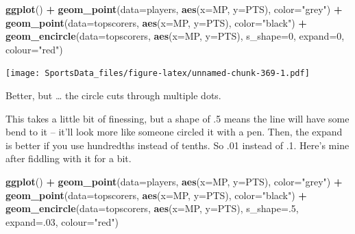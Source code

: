 \documentclass[
]{book}
\newenvironment{Shaded}{\begin{snugshade}}{\end{snugshade}}
\newcommand{\DataTypeTok}[1]{\textcolor[rgb]{0.13,0.29,0.53}{#1}}
\newcommand{\DecValTok}[1]{\textcolor[rgb]{0.00,0.00,0.81}{#1}}
\newcommand{\KeywordTok}[1]{\textcolor[rgb]{0.13,0.29,0.53}{\textbf{#1}}}
\newcommand{\NormalTok}[1]{#1}
\newcommand{\OperatorTok}[1]{\textcolor[rgb]{0.81,0.36,0.00}{\textbf{#1}}}
\newcommand{\StringTok}[1]{\textcolor[rgb]{0.31,0.60,0.02}{#1}}
\begin{document}
\begin{Shaded}
\begin{Highlighting}[]
\KeywordTok{ggplot}\NormalTok{() }\OperatorTok{+}\StringTok{ }
\StringTok{  }\KeywordTok{geom_point}\NormalTok{(}\DataTypeTok{data=}\NormalTok{players, }\KeywordTok{aes}\NormalTok{(}\DataTypeTok{x=}\NormalTok{MP, }\DataTypeTok{y=}\NormalTok{PTS), }\DataTypeTok{color=}\StringTok{"grey"}\NormalTok{) }\OperatorTok{+}\StringTok{ }
\StringTok{  }\KeywordTok{geom_point}\NormalTok{(}\DataTypeTok{data=}\NormalTok{topscorers, }\KeywordTok{aes}\NormalTok{(}\DataTypeTok{x=}\NormalTok{MP, }\DataTypeTok{y=}\NormalTok{PTS), }\DataTypeTok{color=}\StringTok{"black"}\NormalTok{) }\OperatorTok{+}\StringTok{ }
\StringTok{  }\KeywordTok{geom_encircle}\NormalTok{(}\DataTypeTok{data=}\NormalTok{topscorers, }\KeywordTok{aes}\NormalTok{(}\DataTypeTok{x=}\NormalTok{MP, }\DataTypeTok{y=}\NormalTok{PTS), }\DataTypeTok{s_shape=}\DecValTok{0}\NormalTok{, }\DataTypeTok{expand=}\DecValTok{0}\NormalTok{, }\DataTypeTok{colour=}\StringTok{"red"}\NormalTok{)}
\end{Highlighting}
\end{Shaded}

\texttt{[image: SportsData\_files/figure-latex/unnamed-chunk-369-1.pdf]}

Better, but \ldots{} the circle cuts through multiple dots.

This takes a little bit of finessing, but a shape of .5 means the line will have some bend to it -- it'll look more like someone circled it with a pen. Then, the expand is better if you use hundredths instead of tenths. So .01 instead of .1. Here's mine after fiddling with it for a bit.

\begin{Shaded}
\begin{Highlighting}[]
\KeywordTok{ggplot}\NormalTok{() }\OperatorTok{+}\StringTok{ }
\StringTok{  }\KeywordTok{geom_point}\NormalTok{(}\DataTypeTok{data=}\NormalTok{players, }\KeywordTok{aes}\NormalTok{(}\DataTypeTok{x=}\NormalTok{MP, }\DataTypeTok{y=}\NormalTok{PTS), }\DataTypeTok{color=}\StringTok{"grey"}\NormalTok{) }\OperatorTok{+}\StringTok{ }
\StringTok{  }\KeywordTok{geom_point}\NormalTok{(}\DataTypeTok{data=}\NormalTok{topscorers, }\KeywordTok{aes}\NormalTok{(}\DataTypeTok{x=}\NormalTok{MP, }\DataTypeTok{y=}\NormalTok{PTS), }\DataTypeTok{color=}\StringTok{"black"}\NormalTok{) }\OperatorTok{+}\StringTok{ }
\StringTok{  }\KeywordTok{geom_encircle}\NormalTok{(}\DataTypeTok{data=}\NormalTok{topscorers, }\KeywordTok{aes}\NormalTok{(}\DataTypeTok{x=}\NormalTok{MP, }\DataTypeTok{y=}\NormalTok{PTS), }\DataTypeTok{s_shape=}\NormalTok{.}\DecValTok{5}\NormalTok{, }\DataTypeTok{expand=}\NormalTok{.}\DecValTok{03}\NormalTok{, }\DataTypeTok{colour=}\StringTok{"red"}\NormalTok{)}
\end{Highlighting}
\end{Shaded}
\end{document}
